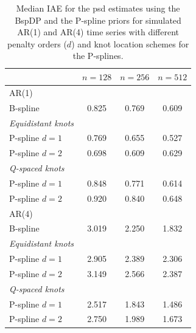 \documentclass[twocolumn,final]{svjour3}
\begin{document}

\def\arraystretch{1.1}
\begin{table}
	\centering
		\begin{tabular}{lccc}
			\toprule
			& $n=128$ & $n=256$ & $n=512$ \\ \hline
			AR(1)     &  &  &  \\ 
			B-spline &  0.825 & 0.769 & 0.609  \\
			\textit{Equidistant knots}& & &   \\
			\hspace{0.5em}P-spline $d=1$ &  0.769 & 0.655 & 0.527 \\
			\hspace{0.5em}P-spline $d=2$&  0.698 & 0.609 & 0.629 \\
			\textit{Q-spaced knots}& & &   \\
			\hspace{0.5em}P-spline $d=1$ & 0.848 & 0.771 & 0.614 \\
			\hspace{0.5em}P-spline $d=2$ & 0.920 & 0.840 & 0.648 \\ \hline
			AR(4)     &  &  &  \\ 
			B-spline & 3.019 & 2.250 & 1.832   \\
			\textit{Equidistant knots}& & &   \\
			\hspace{0.5em}P-spline $d=1$ &  2.905 & 2.389 & 2.306\\
			\hspace{0.5em}P-spline $d=2$&  3.149 & 2.566 & 2.387\\
			\textit{Q-spaced knots}& & &   \\
			\hspace{0.5em}P-spline $d=1$ & 2.517 & 1.843 & 1.486\\
			\hspace{0.5em}P-spline $d=2$ &  2.750 & 1.989 & 1.673\\
			\bottomrule
		\end{tabular}
	\caption{Median IAE for the psd estimates using the BspDP and the P-spline priors for simulated AR(1) and AR(4) time series with  different penalty orders ($d$) and knot location schemes for the P-splines.}
	\label{table:sim_IAE}
\end{table}
\end{document}
